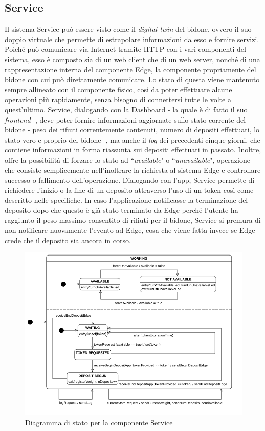 \documentclass[a4paper, 12pt]{report}
\begin{document}
			\subsection{Service}
			Il sistema Service può essere visto come il \textit{digital twin} del bidone, ovvero il suo
			doppio virtuale che permette di estrapolare informazioni da esso e fornire servizi. Poiché
			può comunicare via Internet tramite HTTP con i vari componenti del sistema, esso è composto
			sia di un web client che di un web server, nonché di una rappresentazione interna del
			componente Edge, la componente propriamente del bidone con cui può direttamente comunicare. Lo
			stato di questa viene mantenuto sempre allineato con il componente fisico, così da poter
			effettuare alcune operazioni più rapidamente, senza bisogno di connettersi tutte le volte
			a quest'ultimo. Service, dialogando con la Dashboard - la quale è di fatto il suo
			\textit{frontend} -, deve poter fornire informazioni aggiornate sullo stato corrente del
			bidone - peso dei rifiuti correntemente contenuti, numero di depositi effettuati, lo stato
			vero e proprio del bidone -, ma anche il \textit{log} dei precedenti cinque giorni, che
			contiene informazioni in forma riassunta sui depositi effettuati in passato. Inoltre, offre
			la possibilità di forzare lo stato ad ``\textit{available}" o ``\textit{unavailable}", 
			operazione che consiste semplicemente nell'inoltrare la richiesta al sistema Edge e 
			controllare successo o fallimento dell'operazione.\newline 
			Dialogando con l'app, Service permette di richiedere l'inizio o la fine di un
			deposito attraverso l'uso di un token così come descritto nelle specifiche. In caso
			l'applicazione notificasse la terminazione del deposito dopo che questo è già stato terminato
			da Edge perché l'utente ha raggiunto il peso massimo consentito di rifiuti per il bidone,
			Service si premura di non notificare nuovamente l'evento ad Edge, cosa che viene fatta invece se 
			Edge crede che il deposito sia ancora in corso.
			\begin{figure}[H]
				\centering
				\includegraphics[width=\textwidth]{"img/ServiceStatechart"}    
				\caption{Diagramma di stato per la componente Service}
			\end{figure}
\end{document}
